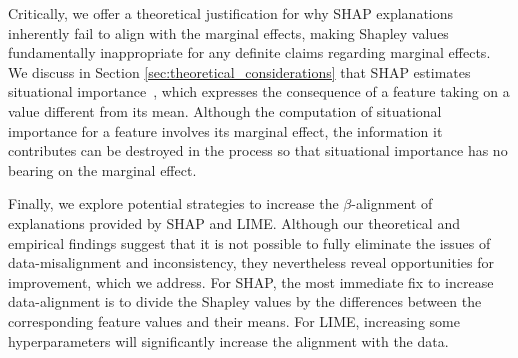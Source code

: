 \documentclass[mnsc,blindrev]{informs3}
\begin{document}
Critically, we offer a theoretical justification for why SHAP explanations inherently fail to align with the marginal effects, making Shapley values fundamentally inappropriate for any definite claims regarding marginal effects. We discuss in Section \ref{sec:theoretical_considerations} that SHAP estimates situational importance~\citep{StrumbeljErik2014Epma}, 
 which expresses the consequence of a feature taking on a value different from its mean. Although the computation of situational importance for a feature involves its marginal effect, the information it contributes can be destroyed in the process so that situational importance has no bearing on the marginal effect.%




Finally, we explore potential strategies to increase the $\beta$-alignment of explanations provided by SHAP and LIME. Although our theoretical and empirical findings suggest that it is not possible to fully eliminate the issues of data-misalignment and inconsistency, they nevertheless reveal opportunities for improvement, which we address. For SHAP, the most immediate fix to increase data-alignment is to divide the Shapley values by the differences between the corresponding feature values and their means. For LIME, increasing some hyperparameters will significantly increase the alignment with the data.
\end{document}
